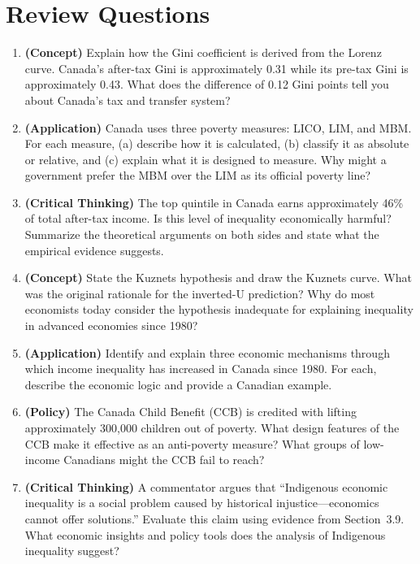 \section*{Review Questions}

\begin{enumerate}

\item \textbf{(Concept)} Explain how the Gini coefficient is derived from the Lorenz curve. Canada's after-tax Gini is approximately 0.31 while its pre-tax Gini is approximately 0.43. What does the difference of 0.12 Gini points tell you about Canada's tax and transfer system?

\item \textbf{(Application)} Canada uses three poverty measures: LICO, LIM, and MBM. For each measure, (a) describe how it is calculated, (b) classify it as absolute or relative, and (c) explain what it is designed to measure. Why might a government prefer the MBM over the LIM as its official poverty line?

\item \textbf{(Critical Thinking)} The top quintile in Canada earns approximately 46\% of total after-tax income. Is this level of inequality economically harmful? Summarize the theoretical arguments on both sides and state what the empirical evidence suggests.

\item \textbf{(Concept)} State the Kuznets hypothesis and draw the Kuznets curve. What was the original rationale for the inverted-U prediction? Why do most economists today consider the hypothesis inadequate for explaining inequality in advanced economies since 1980?

\item \textbf{(Application)} Identify and explain three economic mechanisms through which income inequality has increased in Canada since 1980. For each, describe the economic logic and provide a Canadian example.

\item \textbf{(Policy)} The Canada Child Benefit (CCB) is credited with lifting approximately 300,000 children out of poverty. What design features of the CCB make it effective as an anti-poverty measure? What groups of low-income Canadians might the CCB fail to reach?

\item \textbf{(Critical Thinking)} A commentator argues that ``Indigenous economic inequality is a social problem caused by historical injustice---economics cannot offer solutions.'' Evaluate this claim using evidence from Section~3.9. What economic insights and policy tools does the analysis of Indigenous inequality suggest?

\end{enumerate}

